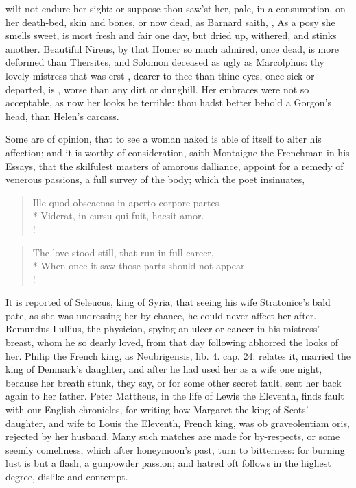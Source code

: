 wilt not endure her sight: or suppose thou saw'st her, pale, in a
consumption, on her death-bed, skin and bones, or now dead,  as Barnard saith, , As a posy she smells sweet, is most
fresh and fair one day, but dried up, withered, and stinks another. Beautiful
Nireus, by that Homer so much admired, once dead, is more deformed than
Thersites, and Solomon deceased as ugly as Marcolphus: thy lovely mistress that
was erst , dearer to thee than
thine eyes, once sick or departed, is , worse
than any dirt or dunghill. Her embraces were not so acceptable, as now her
looks be terrible: thou hadst better behold a Gorgon's head, than Helen's
carcass.

Some are of opinion, that to see a woman naked is able of itself to
alter his affection; and it is worthy of consideration, saith
Montaigne the Frenchman in his Essays, that the skilfulest
masters of amorous dalliance, appoint for a remedy of venerous
passions, a full survey of the body; which the poet insinuates,

\begin{latin}
\begin{verse}%
Ille quod obscaenas in aperto corpore partes\\*
Viderat, in cursu qui fuit, haesit amor.\\!
\end{verse}%
\end{latin}
\translationrule%
\begin{verse}%
The love stood still, that run in full career,\\*
When once it saw those parts should not appear.\\!
\end{verse}%
%

It is reported of Seleucus, king of Syria, that seeing his wife
Stratonice's bald pate, as she was undressing her by chance, he could
never affect her after. Remundus Lullius, the physician, spying an
ulcer or cancer in his mistress' breast, whom he so dearly loved, from
that day following abhorred the looks of her. Philip the French king,
as Neubrigensis, lib. 4. cap. 24. relates it, married the king of
Denmark's daughter, and after he had used her as a wife one
night, because her breath stunk, they say, or for some other secret
fault, sent her back again to her father. Peter Mattheus, in the life
of Lewis the Eleventh, finds fault with our English chronicles,
for writing how Margaret the king of Scots' daughter, and wife to Louis
the Eleventh, French king, was ob graveolentiam oris, rejected by her
husband. Many such matches are made for by-respects, or some seemly
comeliness, which after honeymoon's past, turn to bitterness: for
burning lust is but a flash, a gunpowder passion; and hatred oft
follows in the highest degree, dislike and contempt.

